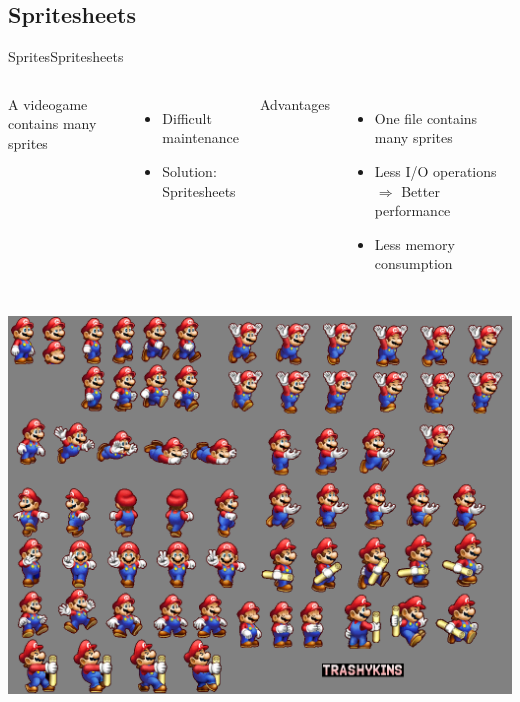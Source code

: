 \documentclass[10pt,compress]{beamer} %
\begin{document}
\subsection{Spritesheets}

\begin{frame}{Sprites}{Spritesheets}
    \begin{columns}
    A videogame contains many sprites
        \begin{itemize}
        \item Difficult maintenance
        \item Solution: Spritesheets
	    \end{itemize}

    Advantages
        \begin{itemize}
        \item One file contains many sprites
        \item Less I/O operations $\Rightarrow$ Better performance
        \item Less memory consumption
	    \end{itemize}
   \end{columns}

    \centering

    \begin{columns}
		\includegraphics[width=\linewidth]{figs/mario-spritesheet.png}


\end{columns}
\end{frame}
\end{document}
